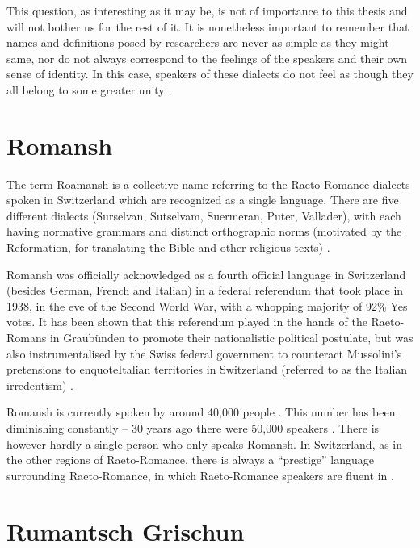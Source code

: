 This question, as interesting as it may be, is not of importance to this thesis and will not bother us for the rest of it.
It is nonetheless important to remember that names and definitions posed by researchers are never as simple as they might same, nor do not always correspond to the feelings of the speakers and their own sense of identity. 
In this case, speakers of these dialects do not feel as though they all belong to some greater unity \autocite[175]{bossong2008}.

\section{Romansh}
The term Roamansh is a collective name referring to the Raeto-Romance dialects spoken in Switzerland which are recognized as a single language. 
There are five different dialects (Surselvan, Sutselvam, Suermeran, Puter, Vallader), with each having normative grammars and distinct orthographic norms (motivated by the Reformation, for translating the Bible and other religious texts) \autocites[1]{haiman1992}[178]{bossong2008}.

Romansh was officially acknowledged as a fourth official language in Switzerland (besides German, French and Italian) in a federal referendum that took place in 1938, in the eve of the Second World War, with a whopping majority of 92\% Yes votes. 
It has been shown that this referendum played in the hands of the Raeto-Romans in Graubünden to promote their nationalistic political postulate, but was also instrumentalised by the Swiss federal government to counteract Mussolini's pretensions to enquote{Italian} territories in Switzerland (referred to as the Italian irredentism) \autocite{valaer2012}.

Romansh is currently spoken by around 40,000 people \autocite{bundesamt2020}. 
This number has been diminishing constantly -- 30 years ago there were 50,000 speakers \autocite{haiman1992}. 
There is however hardly a single person who only speaks Romansh. 
In Switzerland, as in the other regions of Raeto-Romance, there is always a \enquote{prestige} language surrounding Raeto-Romance, in which Raeto-Romance speakers are fluent in \autocite[3]{haiman1992}. 

\section{Rumantsch Grischun}
